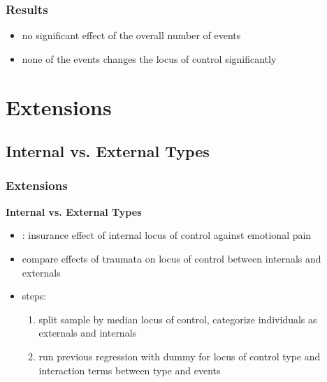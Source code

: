 \documentclass{beamer}
\begin{document}
\begin{frame}[plain] %
\fontsize{5}{5}\selectfont
\begin{table}
	
\end{table}
\end{frame}

\begin{frame}[plain]
\fontsize{5}{6}\selectfont
\begin{table}
	
\end{table}
\end{frame}

\begin{frame}[t]\frametitle{Results}
\fontsize{6}{6}\selectfont
\begin{table}

\end{table}
\fontsize{11}{9}\selectfont
\begin{itemize}
	\item<+-> no significant effect of the overall number of events
	\item<+-> none of the events changes the locus of control significantly
\end{itemize}
\end{frame}



\section{Extensions} %
\label{sec:extensions}

\subsection{Internal vs. External Types} %
\label{sub:internal_vs_external_types}
\begin{frame}[t]\frametitle{Extensions}
\textbf{Internal vs. External Types}
\begin{itemize}
	\item<+-> \citet{buddelmeyer2016}: insurance effect of internal locus of control against emotional pain
	\item<+-> compare effects of traumata on locus of control between internals and externals
	\item<+-> steps:
	\begin{enumerate}
		\item split sample by median locus of control, categorize individuals as externals and internals
		\item run previous regression with dummy for locus of control type and interaction terms between type and events
		\end{enumerate}
	\end{itemize}
\end{frame}
\end{document}
